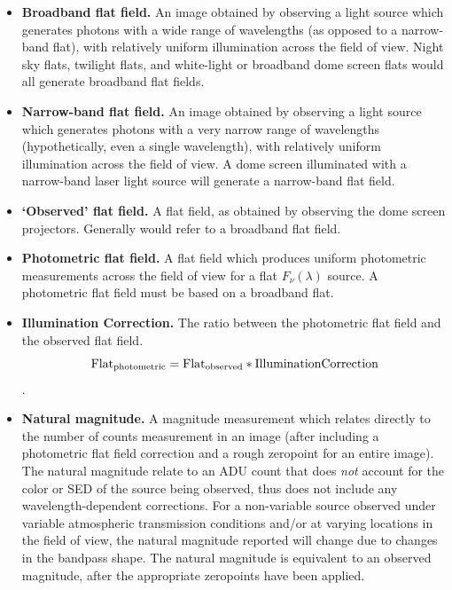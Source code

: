 \documentclass[12pt,preprint]{aastex}
\begin{document}
\begin{itemize}
\item{{\bf Broadband flat field.} An image obtained by observing a
light source which generates photons with a wide range of wavelengths
(as opposed to a narrow-band flat), with relatively uniform
illumination across the field of view. Night sky flats, twilight
flats, and white-light or broadband dome screen flats would all
generate broadband flat fields.}

\item{{\bf Narrow-band flat field.} An image obtained by
    observing a light source which generates photons with a very
    narrow range of wavelengths (hypothetically, even a single
    wavelength), with relatively uniform illumination across the field
    of view. A dome screen illuminated with a narrow-band laser light
    source will generate a narrow-band flat field. }

\item{{\bf `Observed' flat field.} A flat field, as obtained by
    observing the dome screen projectors. Generally would refer to a
    broadband flat field.}

\item{{\bf Photometric flat field.} A flat field which produces
    uniform photometric measurements across the field of view for a
    flat $F_\nu(\lambda)$ source. A photometric flat field must be
    based on a broadband flat.}

\item{{\bf Illumination Correction.} The ratio between the
    photometric flat field  and the observed flat field. 
\begin{equation}
\rm{Flat}_{photometric} = \rm{Flat}_{observed} * \rm{Illumination
 Correction}
\end{equation}. 
}

\item{{\bf Natural magnitude.} A magnitude measurement which relates
    directly to the number of counts measurement in an image (after
    including a photometric flat field correction and a rough
    zeropoint for an entire image). The natural magnitude relate to
    an ADU count that does {\it not} account for the color or SED of
    the source being observed, thus does not include any
    wavelength-dependent corrections. For a non-variable source
    observed under variable atmospheric transmission conditions and/or at
    varying locations in the field of view, the natural magnitude
    reported will change due to changes in the bandpass shape. The
    natural magnitude is equivalent to an observed
    magnitude, after the appropriate zeropoints have been applied.} 


\end{itemize}
\end{document}
